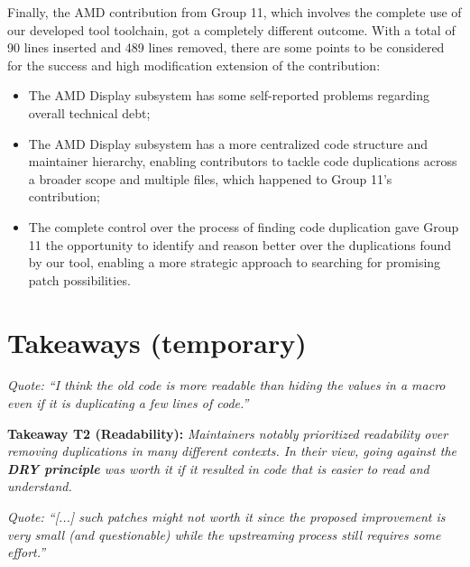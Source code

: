 \documentclass[10pt,conference]{IEEEtran}
\newenvironment{takeaway}[1]{%
  \begin{tcolorbox}
  \textbf{#1:} \itshape}{\end{tcolorbox}}
\begin{document}
Finally, the AMD contribution from Group 11, which involves the complete use of our developed tool toolchain, got a completely different outcome. With a total of 90 lines inserted and 489 lines removed, there are some points to be considered for the success and high modification extension of the contribution:

\begin{itemize}
    \item The AMD Display subsystem has some self-reported problems regarding overall technical debt;
    \item The AMD Display subsystem has a more centralized code structure and maintainer hierarchy, enabling contributors to tackle code duplications across a broader scope and multiple files, which happened to Group 11's contribution;
    \item The complete control over the process of finding code duplication gave Group 11 the opportunity to identify and reason better over the duplications found by our tool, enabling a more strategic approach to searching for promising patch possibilities. 
\end{itemize}

\section{Takeaways (temporary)}

\noindent
\begin{footnotesize}
  \textit{
    Quote: ``I think the old code is more readable than hiding the values in a macro
    even if it is duplicating a few lines of code.''
  }
\end{footnotesize}

\begin{takeaway}{Takeaway T2 (Readability)}
  Maintainers notably prioritized readability over removing duplications in
  many different contexts. In their view, going against the \textbf{DRY
  principle} was worth it if it resulted in code that is easier to read and
  understand.
\end{takeaway}

\noindent
\begin{footnotesize}
\textit{
    Quote: ``[...] such patches might not worth it since the proposed
    improvement is very small (and questionable) while the upstreaming process
    still requires some effort.''
  }
\end{footnotesize}
\end{document}
